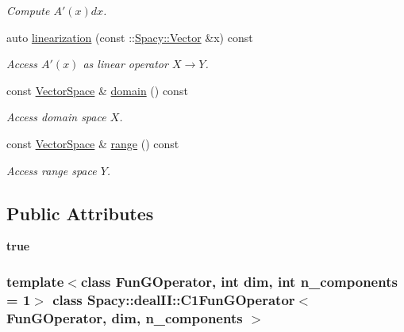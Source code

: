 \begin{DoxyCompactItemize}
\begin{DoxyCompactList}\small\item\em \-Compute $A'(x)dx$. \end{DoxyCompactList}\item 
auto \hyperlink{classSpacy_1_1dealII_1_1C1FunGOperator_abcf7d0778ef1206a5fbc7ccf2d965227}{linearization} (const \-::\hyperlink{classSpacy_1_1Vector}{\-Spacy\-::\-Vector} \&x) const 
\begin{DoxyCompactList}\small\item\em \-Access $A'(x)$ as linear operator $X\rightarrow Y$. \end{DoxyCompactList}\item 
\hypertarget{classSpacy_1_1OperatorBase_a2588f9b3e0188820c4c494e63293dc6f}{const \hyperlink{classSpacy_1_1VectorSpace}{\-Vector\-Space} \& \hyperlink{classSpacy_1_1OperatorBase_a2588f9b3e0188820c4c494e63293dc6f}{domain} () const }\label{classSpacy_1_1OperatorBase_a2588f9b3e0188820c4c494e63293dc6f}

\begin{DoxyCompactList}\small\item\em \-Access domain space $X$. \end{DoxyCompactList}\item 
\hypertarget{classSpacy_1_1OperatorBase_ab19d3b7a6f290b1079248f1e567e53d6}{const \hyperlink{classSpacy_1_1VectorSpace}{\-Vector\-Space} \& \hyperlink{classSpacy_1_1OperatorBase_ab19d3b7a6f290b1079248f1e567e53d6}{range} () const }\label{classSpacy_1_1OperatorBase_ab19d3b7a6f290b1079248f1e567e53d6}

\begin{DoxyCompactList}\small\item\em \-Access range space $Y$. \end{DoxyCompactList}\end{DoxyCompactItemize}
\subsection*{\-Public \-Attributes}
\begin{DoxyCompactItemize}
\item 
\hypertarget{classSpacy_1_1dealII_1_1C1FunGOperator_a73f0f33ba9da433eefe3113b7660998b}{{\bfseries true}}\label{classSpacy_1_1dealII_1_1C1FunGOperator_a73f0f33ba9da433eefe3113b7660998b}

\end{DoxyCompactItemize}
\subsubsection*{template$<$class Fun\-G\-Operator, int dim, int n\-\_\-components = 1$>$ class Spacy\-::deal\-I\-I\-::\-C1\-Fun\-G\-Operator$<$ Fun\-G\-Operator, dim, n\-\_\-components $>$}



